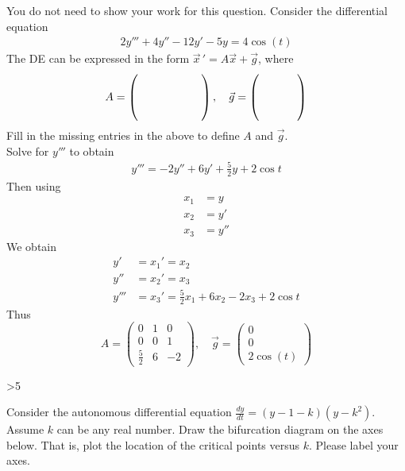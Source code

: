 \ifnum {}
    \question[2] You do not need to show your work for this question. Consider the differential equation 
    \begin{align*}
        2y''' + 4y'' - 12y'  - 5y = 4\cos(t)
    \end{align*}
    The DE can be expressed in the form $\vec x\, ' = A\vec x + \vec g$, where 
    \begin{align*}
     A = \left( \hbox to 2cm{\vbox to 0.85cm{}} \right), \quad \vec g = \left( \hbox to 1.2cm{\vbox to 0.85cm{}} \right)
    \end{align*}
    Fill in the missing entries in the above to define $A$ and $\vec g$. 
    \ifnum {} {\color{DarkBlue} \\[12pt] 
    Solve for $y'''$ to obtain
    \begin{align}
        y''' = - 2y'' + 6y' + \frac{5}{2}y + 2\cos t
    \end{align}
    Then using
    \begin{align}
        x_1 & = y \\
        x_2 &= y' \\
        x_3 &= y''
    \end{align}
    We obtain 
    \begin{align}
        y' &= x_1 ' = x_2 \\
        y'' &= x_2' = x_3 \\
        y''' & = x_3 ' = \frac{5}{2}x_1 + 6 x_2 - 2x_3 + 2\cos t
    \end{align}
    Thus
    $$A = \begin{pmatrix} 0&1&0\\0&0&1\\\frac52& 6 & -2\end{pmatrix}, \quad \vec g = \begin{pmatrix} 0\\0\\2\cos(t)\end{pmatrix}$$
    } 
    \else 
    \fi    
\fi

\ifnum \Version>5

\question[1] Consider the autonomous differential equation $\displaystyle \frac{dy}{dt}= (y-1-k)(y-k^2)$.  Assume $k$ can be any real number. Draw the bifurcation diagram on the axes below. That is, plot the location of the critical points versus $k$. Please label your axes.


